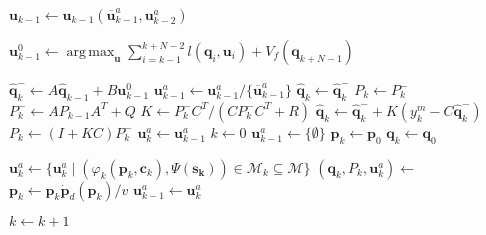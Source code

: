 \documentclass[letterpaper,10pt,conference]{ieeeconf}
\DeclarePairedDelimiter\abs{\lvert}{\rvert}%
\theoremstyle{definition}
\DeclareMathOperator*{\argmax}{arg\,max}
\begin{document}
\begin{algorithmic}[1]
  \label{alg:step}
  
  \State $\mathbf{u}_{k-1}\gets {\mathbf{u}_{k-1}(\overline{\mathbf{u}}_{k-1}^a,\mathbf{u}_{k-2}^a)}$\label{alg:max_cont_sequence}

  \State $\mathbf{u}^0_{k-1}\gets\argmax_{\mathbf{u}}{\sum_{i=k-1}^{k+N-2}{l(\mathbf{q}_i,\mathbf{u}_i)+V_f(\mathbf{q}_{k+N-1})}}$\label{alg:mpc}

  \State $\hat{\mathbf{q}}_k^-\gets A\hat{\mathbf{q}}_{k-1} + B\mathbf{u}^0_{k-1}$
  \label{alg:output_constraints}
    \State $\mathbf{u}^a_{k-1}\gets\mathbf{u}^a_{k-1}/\{\overline{\mathbf{u}}^a_{k-1}\}$
    \State{}\label{alg:recursion}
  \Else
      \State $\hat{\mathbf{q}}_k\gets\hat{\mathbf{q}}_k^-$\label{alg:evolution}
      \State $P_k\gets P_k^-$
    \Else 
      \State $P_k^-\gets AP_{k-1}A^T+Q$\label{alg:kalman_start}
      \State $K\gets P_k^-C^T/(CP_k^-C^T+R)$
      \State $\hat{\mathbf{q}}_k\gets \hat{\mathbf{q}}_k^-+K(y_k^m-C\hat{\mathbf{q}}_k^-)$
      \State $P_k\gets(I+KC)P_k^-$\label{alg:kalman_end}
    \EndIf
    \State $\mathbf{u}_{k}^a\gets \mathbf{u}_{k-1}^a$
    \State{}
  \EndIf
  \EndProcedure
\vspace*{1ex}
  \State $k\gets 0$
  \State $\mathbf{u}_{k-1}^a\gets\{\emptyset\}$
  \State $\mathbf{p}_k\gets\mathbf{p}_0$
  \State $\mathbf{q}_k\gets\mathbf{q}_0$
    
    \State $\mathbf{u}_{k}^a\gets \{\mathbf{u}_{k}^a\mid(\varphi_k(\mathbf{p}_{k},\mathbf{c}_{k}),\Psi(\mathbf{s_{k}}))\in\mathcal{M}_{k}\subseteq\mathcal{M}\}$
    \State $(\mathbf{q}_k,P_k,\mathbf{u}_k^a)\gets$\label{alg:en}
    \State $\mathbf{p}_{k}\gets\mathbf{p}_k\dot{\mathbf{p}}_d(\mathbf{p}_k)/v$\label{alg:pos}
    \State $\mathbf{u}_{k-1}^a\gets\mathbf{u}_{k}^a$

    \State $k\gets k + 1$
  \EndWhile 
  \EndProcedure
\end{algorithmic}
\end{document}
